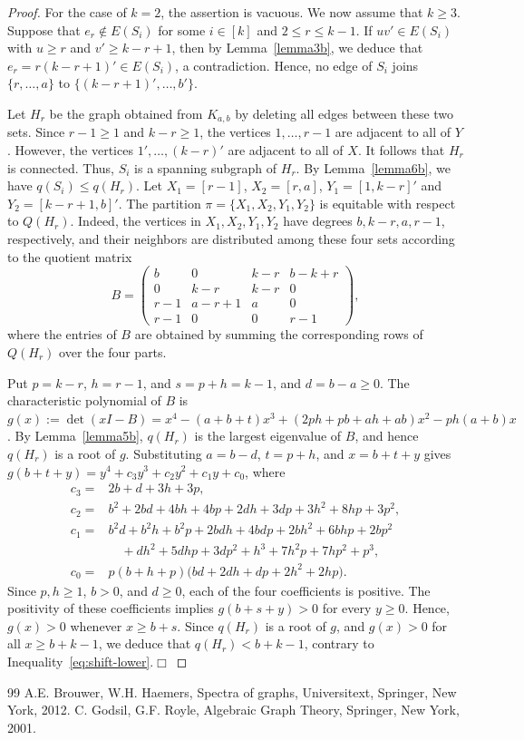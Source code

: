\documentclass[10pt,a4paper]{amsart}
\def\qed{\hfill$\Box$\vspace{12pt}}
\begin{document}
\begin{proof}
For the case of $k=2$, the assertion is vacuous. We now assume that $k\ge3$. Suppose that $e_r\notin E(S_i)$ for some $i\in[k]$ and $2\le r\le k-1$. If $uv'\in E(S_i)$ with $u\ge r$ and $v'\ge k-r+1$, then by Lemma~\ref{lemma3b}, we deduce that $e_r=r(k-r+1)'\in E(S_i)$, a contradiction. Hence, no edge of $S_i$ joins $\{r,\ldots,a\}$ to $\{(k-r+1)',\ldots,b'\}$.

Let $H_r$ be the graph obtained from $K_{a,b}$ by deleting all edges between these two sets. Since $r-1\ge1$ and $k-r\ge1$, the vertices $1,\ldots,r-1$ are adjacent to all of $Y$. However, the vertices $1',\ldots,(k-r)'$ are adjacent to all of $X$. It follows that $H_r$ is connected. Thus, $S_i$ is a spanning subgraph of $H_r$. By Lemma~\ref{lemma6b}, we have $q(S_i)\le q(H_r)$. Let $X_1=[r-1]$, $X_2=[r,a]$, $Y_1=[1,k-r]'$ and $Y_2=[k-r+1,b]'$. The partition $\pi=\{X_1,X_2,Y_1,Y_2\}$
is equitable with respect to $Q(H_r)$. Indeed, the vertices in \(X_1,X_2,Y_1,Y_2\) have degrees \(b,k-r,a,r-1\), respectively, and their neighbors are distributed among these four sets according to the quotient matrix
\[B=\begin{pmatrix}
b&0&k-r&b-k+r\\
0&k-r&k-r&0\\
r-1&a-r+1&a&0\\
r-1&0&0&r-1
\end{pmatrix},
\]
where the entries of \(B\) are obtained by summing the corresponding rows of \(Q(H_r)\) over the four parts.

Put $p=k-r$, $h=r-1$, and $s=p+h=k-1$, and $d=b-a\ge0$. The characteristic polynomial of $B$ is
$g(x):=\det(xI-B)=x^4-(a+b+t)x^3+(2ph+pb+ah+ab)x^2-ph(a+b)x$. By Lemma~\ref{lemma5b}, $q(H_r)$ is the largest eigenvalue of $B$, and hence $q(H_r)$ is a root of $g$. Substituting $a=b-d$, $t=p+h$, and $x=b+t+y$ gives
$g(b+t+y)=y^4+c_3y^3+c_2y^2+c_1y+c_0$, where
\begin{align*}
c_3={}&2b+d+3h+3p,\\
c_2={}&b^2+2bd+4bh+4bp+2dh+3dp+3h^2+8hp+3p^2,\\
c_1={}&b^2d+b^2h+b^2p+2bdh+4bdp+2bh^2+6bhp+2bp^2\\
&\quad+dh^2+5dhp+3dp^2+h^3+7h^2p+7hp^2+p^3,\\
c_0={}&p(b+h+p)\bigl(bd+2dh+dp+2h^2+2hp\bigr).
\end{align*}
Since $p,h\ge1$, $b>0$, and $d\ge0$, each of the four coefficients is positive. The positivity of these coefficients implies $g(b+s+y)>0$ for every $y\ge0$. Hence, $g(x)>0$ whenever $x\ge b+s$. Since $q(H_r)$ is a root of $g$, and $g(x)>0$ for all
$x\ge b+k-1$, we deduce that $q(H_r)<b+k-1$, contrary to Inequality~\eqref{eq:shift-lower}.\qed
\end{proof}

\begin{thebibliography}{99}
 A.E. Brouwer, W.H. Haemers, Spectra of graphs, Universitext, Springer, New York, 2012.
 C. Godsil, G.F. Royle, Algebraic Graph Theory, Springer, New York, 2001.
\end{thebibliography}
\end{document}
